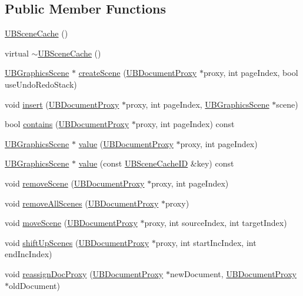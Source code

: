 \subsection*{Public Member Functions}
\begin{DoxyCompactItemize}
\item 
\hyperlink{class_u_b_scene_cache_afcb9fbc590e6d3e6a94b00b501c06b90}{U\-B\-Scene\-Cache} ()
\item 
virtual \hyperlink{class_u_b_scene_cache_ab4d9e10443fcc5dae4616acbef1fec41}{$\sim$\-U\-B\-Scene\-Cache} ()
\item 
\hyperlink{class_u_b_graphics_scene}{U\-B\-Graphics\-Scene} $\ast$ \hyperlink{class_u_b_scene_cache_a74a366b136583e06ee66ac8fa757318a}{create\-Scene} (\hyperlink{class_u_b_document_proxy}{U\-B\-Document\-Proxy} $\ast$proxy, int page\-Index, bool use\-Undo\-Redo\-Stack)
\item 
void \hyperlink{class_u_b_scene_cache_aa3377f2b95c0245c99e6ee6932f78472}{insert} (\hyperlink{class_u_b_document_proxy}{U\-B\-Document\-Proxy} $\ast$proxy, int page\-Index, \hyperlink{class_u_b_graphics_scene}{U\-B\-Graphics\-Scene} $\ast$scene)
\item 
bool \hyperlink{class_u_b_scene_cache_a1554a6fd285fb5a9cf10007f9ac370fc}{contains} (\hyperlink{class_u_b_document_proxy}{U\-B\-Document\-Proxy} $\ast$proxy, int page\-Index) const 
\item 
\hyperlink{class_u_b_graphics_scene}{U\-B\-Graphics\-Scene} $\ast$ \hyperlink{class_u_b_scene_cache_ac4c9c227f72baf18cfeee1f8916f787a}{value} (\hyperlink{class_u_b_document_proxy}{U\-B\-Document\-Proxy} $\ast$proxy, int page\-Index)
\item 
\hyperlink{class_u_b_graphics_scene}{U\-B\-Graphics\-Scene} $\ast$ \hyperlink{class_u_b_scene_cache_a11fe22fa85cc65c6779f3248687613a4}{value} (const \hyperlink{class_u_b_scene_cache_i_d}{U\-B\-Scene\-Cache\-I\-D} \&key) const 
\item 
void \hyperlink{class_u_b_scene_cache_a4da553675ded30f59bff960dbaab6d71}{remove\-Scene} (\hyperlink{class_u_b_document_proxy}{U\-B\-Document\-Proxy} $\ast$proxy, int page\-Index)
\item 
void \hyperlink{class_u_b_scene_cache_abd8f51c78140f742b449f0209d2ddb05}{remove\-All\-Scenes} (\hyperlink{class_u_b_document_proxy}{U\-B\-Document\-Proxy} $\ast$proxy)
\item 
void \hyperlink{class_u_b_scene_cache_a417ca8e2f9801f0db66759012a266b38}{move\-Scene} (\hyperlink{class_u_b_document_proxy}{U\-B\-Document\-Proxy} $\ast$proxy, int source\-Index, int target\-Index)
\item 
void \hyperlink{class_u_b_scene_cache_ac6b7bce6b0fd6ccbc11245c8c5df9865}{shift\-Up\-Scenes} (\hyperlink{class_u_b_document_proxy}{U\-B\-Document\-Proxy} $\ast$proxy, int start\-Inc\-Index, int end\-Inc\-Index)
\item 
void \hyperlink{class_u_b_scene_cache_a611e9c996d9e0e4d3e1ead4264070e1d}{reassign\-Doc\-Proxy} (\hyperlink{class_u_b_document_proxy}{U\-B\-Document\-Proxy} $\ast$new\-Document, \hyperlink{class_u_b_document_proxy}{U\-B\-Document\-Proxy} $\ast$old\-Document)
\end{DoxyCompactItemize}


